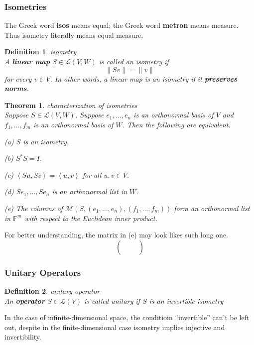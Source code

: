 \documentclass{article}
\newtheorem{theorem}{Theorem}[subsection]
\newtheorem{definition}{Definition}[subsection]
\newcommand{\FF}{\mathbb{F}}
\begin{document}
\begin{CJK}{UTF8}{gkai}
\subsubsection{Isometries}
The Greek word \textbf{isos} means equal; the Greek word \textbf{metron} means measure. Thus isometry literally means equal measure.

\begin{definition}
    isometry\\

    A \textbf{linear map} $S \in \mathcal{L}(V,W)$ is called an isometry if
    \[\|Sv\| = \|v\|\]
    for every $v \in V$. In other words, a linear map is an isometry if it \textbf{preserves norms}.
\end{definition}

\begin{theorem}
    characterization of isometries\\

    Suppose $S \in \mathcal{L}(V,W)$. Suppose $e_1,\ldots,e_n$ is an orthonormal basis of $V$ and $f_1, \ldots, f_m$ is an orthonormal basis of $W$. Then the following are equivalent.

    (a) $S$ is an isometry.

    (b) $S^\ast S = I$.

    (c) $\left<Su,Sv\right> = \left<u,v\right>$ for all $u,v \in V$.

    (d) $Se_1,\ldots,Se_n$ is an orthonormal list in $W$.

    (e) The columns of $\mathcal{M}(S,(e_1,\ldots,e_n),(f_1,\ldots, f_m))$ form an orthonormal list in $\FF^m$ with respect to the Euclidean inner product.
\end{theorem}

For better understanding, the matrix in (e) may look likes such long one.
\[\begin{pmatrix}
    &&\\
    &&\\
    &&\\
    &&\\
\end{pmatrix}\]
\subsubsection{Unitary Operators}

\begin{definition}
    unitary operator\\

    An \textbf{operator} $S \in \mathcal{L}(V)$ is called unitary if $S$ is an invertible isometry
\end{definition}
In the case of infinite-dimensional space, the conditioin ``invertible'' can't be left out, despite in the finite-dimensional case isometry implies injective and invertibility.


\end{CJK}
\end{document}
